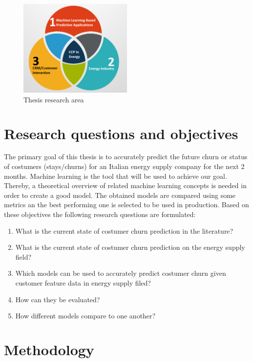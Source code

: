 \documentclass[LaM,binding=0.6cm, english]{sapthesis}
\begin{document}
\begin{figure}[h!]
    \includegraphics[width=0.5\textwidth]{images/Thesis-Research-Area.png}
    \centering
    \caption{Thesis research area}
    \label{fig:research-area}
\end{figure}

\section{Research questions and objectives}

The primary goal of this thesis is to accurately predict the future churn or status of costumers (stays/churns) for an Italian energy supply company for the next 2 months. Machine learning is the tool that will be used to achieve our goal. Thereby, a theoretical overview of related machine learning concepts is needed in order to create a good model. The obtained models are compared using some metrics an the best performing one is selected to be used in production. Based on these objectives the following research questions are formulated:

\begin{enumerate}
	\item What is the current state of costumer churn prediction in the 			literature?
  	\item What is the current state of costumer churn prediction on the energy supply field?
  	\item Which models can be used to accurately predict costumer churn given customer feature data in energy supply filed?
  	\item How can they be evaluated?
  	\item How different models compare to one another?
\end{enumerate}

\section{Methodology}
\end{document}
